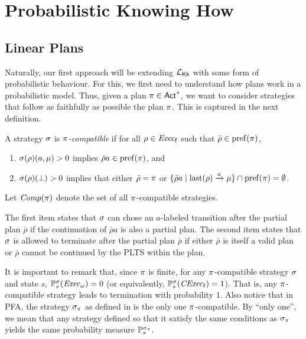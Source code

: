 \section{Probabilistic Knowing How}\label{sec:prob}

\subsection{Linear Plans}\label{subsec:prob:linear}

Naturally, our first approach will be extending ${\mathcal{L}_{{\mathsf{Kh}}}}$ with some
form of probabilistic behaviour.  For this, we first need to
understand how plans work in a probabilistic model.
%
Thus, given a plan $\pi\in{\rm \sf Act}^*$, we want to consider
strategies that follow as faithfully as possible the plan
$\pi$. This is captured in the next definition.

\begin{definition}\label{def:plan:compat}
  A strategy $\sigma$ is \emph{$\pi$-compatible} if for all
  $\rho\in\mathit{Exec}_{\mathsf{f}}$ such that $\bar{\rho}\in\mathrm{pref}(\pi)$,
  \begin{enumerate}
  \item%
    $\sigma(\rho)(a,\mu)>0$ implies $\bar{\rho}a\in\mathrm{pref}(\pi)$, and
  \item%
    $\sigma(\rho)(\bot)>0$ implies that either
    $\bar{\rho}=\pi$ or
    $\{\bar{\rho}a\mid{\mathrm{last}(\rho)\xrightarrow{a}\mu}\}\cap\mathrm{pref}(\pi) = \emptyset$. 
  \end{enumerate}
  Let $\mathit{Comp}(\pi)$ denote the set of all $\pi$-compatible
  strategies.
\end{definition}
%
The first item states that $\sigma$ can chose an $a$-labeled
transition after the partial plan $\bar{\rho}$ if the continuation of
$\bar{\rho}a$ is also a partial plan.
%
The second item states that $\sigma$ is allowed to terminate after the
partial plan $\bar{\rho}$ if either $\bar{\rho}$ is itself a valid
plan or $\bar{\rho}$ cannot be continued by the PLTS within the plan.

It is important to remark that, since $\pi$ is finite, for any
$\pi$-compatible strategy $\sigma$ and state $s$,
$\mathbb{P}^\sigma_s(\mathit{Exec}_\omega)=0$ (or equivalently,
$\mathbb{P}^\sigma_s(\mathit{CExec}_{\mathsf{f}})=1$).  That is, any $\pi$-compatible
strategy leads to termination with probability $1$.
%
Also notice that in PFA, the strategy $\sigma_\pi$ as defined in
 is the only one $\pi$-compatible.  By
``only one'', we mean that any strategy defined so that it satisfy the
same conditions as $\sigma_\pi$ yields the same probability measure
$\mathbb{P}_s^{\sigma_\pi}$.


